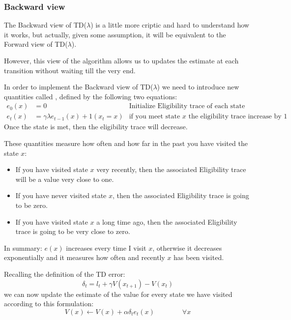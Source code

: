 \subsubsection{Backward view}
The Backward view of TD($\lambda$) is a little more criptic and hard to understand how it works, but actually, given some assumption, it will be equivalent to the Forward view of TD($\lambda$).

However, this view of the algorithm allows us to updates the estimate at each transition without waiting till the very end.

In order to implement the Backward view of TD($\lambda$) we need to introduce new quantities called , defined by the following two equations:
\begin{align*}
e_0(x) &= 0&\text{Initialize Eligibility trace of each state to 0}\\
e_t(x) &= \gamma\lambda e_{t-1}(x) + 1(x_t=x)&\text{if you meet state }x\text{ the eligibility trace increase by 1}
\end{align*}
Once the state is met, then the eligibility trace will decrease.

These quantities measure how often and how far in the past you have visited the state $x$:
\begin{itemize}
\item If you have visited state $x$ very recently, then the associated Eligibility trace will be a value very close to one.
\item If you have never visited state $x$, then the associated Eligibility trace is going to be zero.
\item If you have visited state $x$ a long time ago, then the associated Eligibility trace is going to be very close to zero.
\end{itemize}

In summary: $e(x)$ increases every time I visit $x$, otherwise it decreases exponentially and it measures how often and recently $x$ has been visited.

Recalling the definition of the TD error:
\[\delta_t = l_t + \gamma V(x_{t+1}) - V(x_t)\]
we can now update the estimate of the value for every state we have visited according to this formulation:
\[V(x)\leftarrow V(x) + \alpha\delta_t e_t(x)\qquad\qquad\forall x\]

